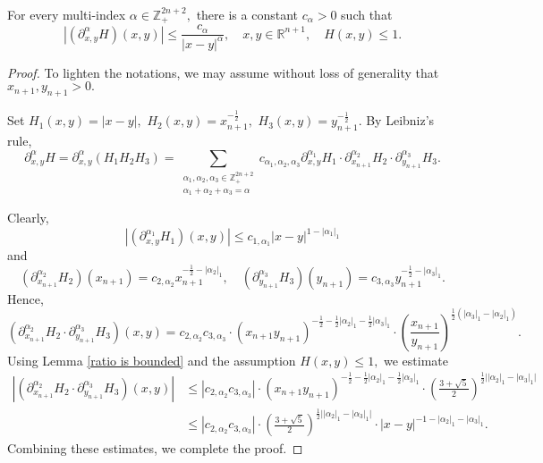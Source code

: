 \documentclass{amsart}
\begin{document}
\begin{lemma}\label{H derivatives lemma} For every multi-index $\alpha\in\mathbb{Z}^{2n+2}_+,$ there is a constant $c_\alpha>0$ such that
$$|(\partial_{x,y}^{\alpha}H)(x,y)|\leq\frac{c_{\alpha}}{|x-y|^{\alpha}},\quad x,y\in\mathbb{R}^{n+1},\quad H(x,y)\leq 1.$$
\end{lemma}
\begin{proof} To lighten the notations, we may assume without loss of generality that $x_{n+1},y_{n+1}>0.$

Set $H_1(x,y)=|x-y|,$ $H_2(x,y)=x_{n+1}^{-\frac12},$ $H_3(x,y)=y_{n+1}^{-\frac12}.$ By Leibniz's rule,
$$\partial_{x,y}^{\alpha}H=\partial_{x,y}^{\alpha}(H_1H_2H_3)=\sum_{\substack{\alpha_1,\alpha_2,\alpha_3\in\mathbb{Z}_+^{2n+2}\\ \alpha_1+\alpha_2+\alpha_3=\alpha}}c_{\alpha_1,\alpha_2,\alpha_3}\partial_{x,y}^{\alpha_1}H_1\cdot\partial_{x_{n+1}}^{\alpha_2}H_2\cdot\partial_{y_{n+1}}^{\alpha_3}H_3.$$

Clearly,
$$|(\partial_{x,y}^{\alpha_1}H_1)(x,y)|\leq c_{1,\alpha_1}|x-y|^{1-|\alpha_1|_1}$$
and
$$(\partial_{x_{n+1}}^{\alpha_2}H_2)(x_{n+1})=c_{2,\alpha_2}x_{n+1}^{-\frac12-|\alpha_2|_1},\quad (\partial_{y_{n+1}}^{\alpha_3}H_3)(y_{n+1})=c_{3,\alpha_3}y_{n+1}^{-\frac12-|\alpha_3|_1}.$$
Hence,
$$(\partial_{x_{n+1}}^{\alpha_2}H_2\cdot\partial_{y_{n+1}}^{\alpha_3}H_3)(x,y)=c_{2,\alpha_2}c_{3,\alpha_3}\cdot (x_{n+1}y_{n+1})^{-\frac12-\frac12|\alpha_2|_1-\frac12|\alpha_3|_1}\cdot (\frac{x_{n+1}}{y_{n+1}})^{\frac12(|\alpha_3|_1-|\alpha_2|_1)}.$$
Using Lemma \ref{ratio is bounded} and the assumption $H(x,y)\leq 1,$ we estimate
\begin{align*}
|(\partial_{x_{n+1}}^{\alpha_2}H_2\cdot\partial_{y_{n+1}}^{\alpha_3}H_3)(x,y)|
&\leq |c_{2,\alpha_2}c_{3,\alpha_3}|\cdot (x_{n+1}y_{n+1})^{-\frac12-\frac12|\alpha_2|_1-\frac12|\alpha_3|_1}\cdot (\frac{3+\sqrt{5}}{2})^{\frac12\big||\alpha_2|_1-|\alpha_3|_1\big|}\\
&\leq |c_{2,\alpha_2}c_{3,\alpha_3}|\cdot (\frac{3+\sqrt{5}}{2})^{\frac12\big||\alpha_2|_1-|\alpha_3|_1\big|}\cdot |x-y|^{-1-|\alpha_2|_1-|\alpha_3|_1}.
\end{align*}	
Combining these estimates, we complete the proof.
\end{proof}
\end{document}
